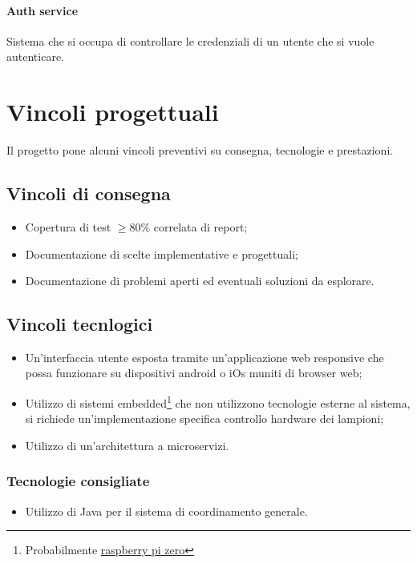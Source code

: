 \paragraph{Auth service} 
Sistema che si occupa di controllare le credenziali di un utente che si vuole autenticare.

\section{Vincoli progettuali}

Il progetto pone alcuni vincoli preventivi su consegna, tecnologie e prestazioni.

\subsection{Vincoli di consegna}
\begin{itemize}
    \item Copertura di test $\geq 80\%$ correlata di report;
    \item Documentazione di scelte implementative e progettuali;
    \item Documentazione di problemi aperti ed eventuali soluzioni da esplorare.
\end{itemize}

\subsection{Vincoli tecnlogici}
\begin{itemize}
    \item Un'interfaccia utente esposta tramite un'applicazione web responsive che possa funzionare su dispositivi android o iOs muniti di browser web;
    \item Utilizzo di sistemi embedded\footnote{Probabilmente \href{https://www.raspberrypi.com/products/raspberry-pi-zero-w/}{raspberry pi zero}} che non utilizzono tecnologie esterne al sistema, si richiede un'implementazione specifica controllo hardware dei lampioni;
    \item Utilizzo di un'architettura a microservizi.
\end{itemize}

\subsubsection{Tecnologie consigliate}

\begin{itemize}
    \item Utilizzo di Java per il sistema di coordinamento generale.
\end{itemize}

